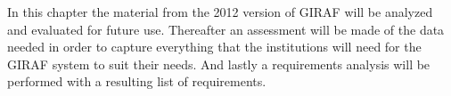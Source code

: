 In this chapter the material from the 2012 version of GIRAF will be analyzed and evaluated for future use. Thereafter an assessment will be made of the data needed in order to capture everything that the institutions will need for the GIRAF system to suit their needs. And lastly a requirements analysis will be performed with a resulting list of requirements. 